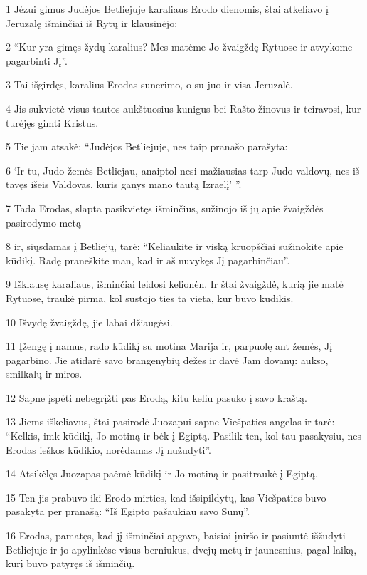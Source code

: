 \par 1 Jėzui gimus Judėjos Betliejuje karaliaus Erodo dienomis, štai atkeliavo į Jeruzalę išminčiai iš Rytų ir klausinėjo: 
\par 2 “Kur yra gimęs žydų karalius? Mes matėme Jo žvaigždę Rytuose ir atvykome pagarbinti Jį”. 
\par 3 Tai išgirdęs, karalius Erodas sunerimo, o su juo ir visa Jeruzalė. 
\par 4 Jis sukvietė visus tautos aukštuosius kunigus bei Rašto žinovus ir teiravosi, kur turėjęs gimti Kristus. 
\par 5 Tie jam atsakė: “Judėjos Betliejuje, nes taip pranašo parašyta: 
\par 6 ‘Ir tu, Judo žemės Betliejau, anaiptol nesi mažiausias tarp Judo valdovų, nes iš tavęs išeis Valdovas, kuris ganys mano tautą­ Izraelį’ ”. 
\par 7 Tada Erodas, slapta pasikvietęs išminčius, sužinojo iš jų apie žvaigždės pasirodymo metą 
\par 8 ir, siųsdamas į Betliejų, tarė: “Keliaukite ir viską kruopščiai sužinokite apie kūdikį. Radę praneškite man, kad ir aš nuvykęs Jį pagarbinčiau”. 
\par 9 Išklausę karaliaus, išminčiai leidosi kelionėn. Ir štai žvaigždė, kurią jie matė Rytuose, traukė pirma, kol sustojo ties ta vieta, kur buvo kūdikis. 
\par 10 Išvydę žvaigždę, jie labai džiaugėsi. 
\par 11 Įžengę į namus, rado kūdikį su motina Marija ir, parpuolę ant žemės, Jį pagarbino. Jie atidarė savo brangenybių dėžes ir davė Jam dovanų: aukso, smilkalų ir miros. 
\par 12 Sapne įspėti nebegrįžti pas Erodą, kitu keliu pasuko į savo kraštą. 
\par 13 Jiems iškeliavus, štai pasirodė Juozapui sapne Viešpaties angelas ir tarė: “Kelkis, imk kūdikį, Jo motiną ir bėk į Egiptą. Pasilik ten, kol tau pasakysiu, nes Erodas ieškos kūdikio, norėdamas Jį nužudyti”. 
\par 14 Atsikėlęs Juozapas paėmė kūdikį ir Jo motiną ir pasitraukė į Egiptą. 
\par 15 Ten jis prabuvo iki Erodo mirties, kad išsipildytų, kas Viešpaties buvo pasakyta per pranašą: “Iš Egipto pašaukiau savo Sūnų”. 
\par 16 Erodas, pamatęs, kad jį išminčiai apgavo, baisiai įniršo ir pasiuntė išžudyti Betliejuje ir jo apylinkėse visus berniukus, dvejų metų ir jaunesnius, pagal laiką, kurį buvo patyręs iš išminčių. 
